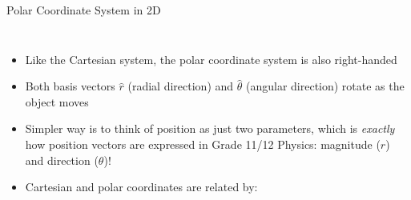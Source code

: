 \documentclass[12pt,compress,aspectratio=169]{beamer}
\begin{document}
\begin{frame}{Polar Coordinate System in 2D}
  \begin{columns}

    \begin{itemize}
    \item Like the Cartesian system, the polar coordinate system is also
      right-handed
    \item Both basis vectors $\hat r$ (radial direction) and $\hat\theta$
      (angular direction) rotate as the object moves
    \item Simpler way is to think of position as just two
      parameters, which is \emph{exactly} how position vectors are expressed in
      Grade 11/12 Physics: magnitude ($r$) and direction ($\theta$)!
    \item Cartesian and polar coordinates are related by:
      
      \vspace{-.35in}{\large
        \begin{align*}
          x&=r\cos\theta\\
          y&=r\sin\theta
        \end{align*}
      }
    \end{itemize}
  \end{columns}
\end{frame}
\end{document}
